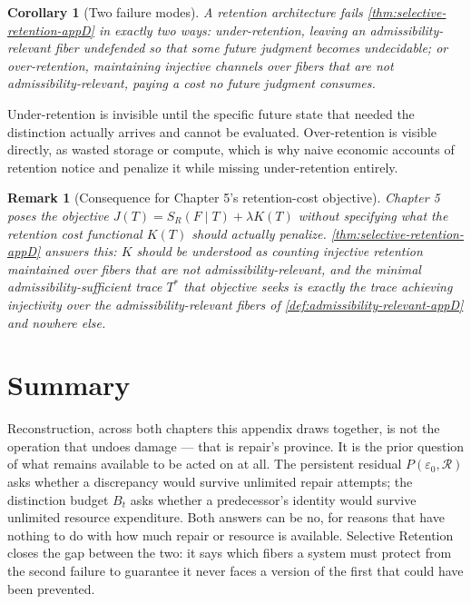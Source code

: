 \documentclass[12pt]{report}
\newtheorem{corollary}[definition]{Corollary}
\newtheorem{remark}[definition]{Remark}
\newcommand{\SR}{\ensuremath{S_R}}
\begin{document}
\begin{corollary}[Two failure modes]
A retention architecture fails \cref{thm:selective-retention-appD} in
exactly two ways: under-retention, leaving an admissibility-relevant
fiber undefended so that some future judgment becomes undecidable; or
over-retention, maintaining injective channels over fibers that are not
admissibility-relevant, paying a cost no future judgment consumes.
\end{corollary}

Under-retention is invisible until the specific future state that needed
the distinction actually arrives and cannot be evaluated. Over-retention
is visible directly, as wasted storage or compute, which is why naive
economic accounts of retention notice and penalize it while missing
under-retention entirely.

\begin{remark}[Consequence for Chapter 5's retention-cost objective]
Chapter 5 poses the objective $J(T) = \SR(F \mid T) + \lambda K(T)$
without specifying what the retention cost functional $K(T)$ should
actually penalize. \cref{thm:selective-retention-appD} answers this: $K$
should be understood as counting injective retention maintained over
fibers that are not admissibility-relevant, and the minimal
admissibility-sufficient trace $T^*$ that objective seeks is exactly the
trace achieving injectivity over the admissibility-relevant fibers of
\cref{def:admissibility-relevant-appD} and nowhere else.
\end{remark}

\section*{Summary}

Reconstruction, across both chapters this appendix draws together, is
not the operation that undoes damage --- that is repair's province. It
is the prior question of what remains available to be acted on at all.
The persistent residual $P(\varepsilon_0,\mathcal{R})$ asks whether a
discrepancy would survive unlimited repair attempts; the distinction
budget $B_t$ asks whether a predecessor's identity would survive
unlimited resource expenditure. Both answers can be no, for reasons that
have nothing to do with how much repair or resource is available.
Selective Retention closes the gap between the two: it says which
fibers a system must protect from the second failure to guarantee it
never faces a version of the first that could have been prevented.
\end{document}
